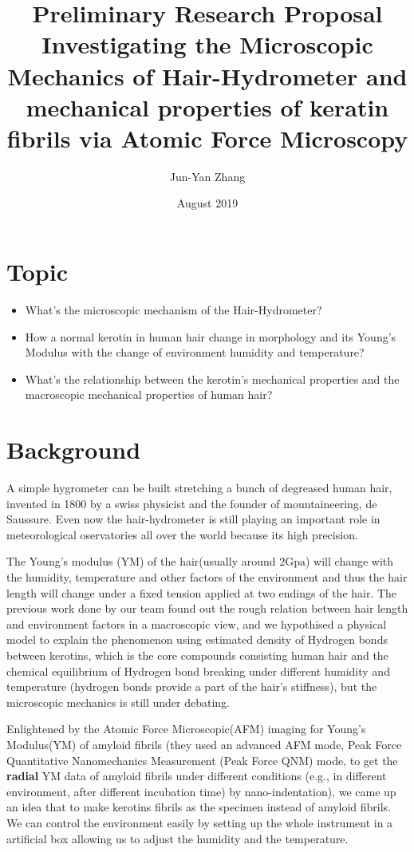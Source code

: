 \documentclass{article}
\title{\textbf{Preliminary Research Proposal}\\Investigating the Microscopic Mechanics of Hair-Hydrometer and mechanical properties of keratin fibrils via Atomic Force Microscopy }
\author{Jun-Yan Zhang}
\date{August 2019}
\begin{document}
\maketitle


\section{Topic}
\begin{itemize}
\item What's the microscopic mechanism of the Hair-Hydrometer?
\item How a normal kerotin in human hair change in morphology and its Young's Modulus with the change of environment humidity and temperature? 
\item What's the relationship between the kerotin's mechanical properties and the macroscopic mechanical properties of human hair?
\end{itemize}

\section{Background}
A simple hygrometer can be built stretching a bunch of degreased human hair, invented in 1800 by a swiss physicist and the founder of mountaineering, de Saussure. Even now the hair-hydrometer is still playing an important role in meteorological oservatories all over the world because its high precision. 

The Young's modulus (YM)  of the hair(usually around $2\mathrm{Gpa}$) will change with the humidity, temperature and other factors of the environment and thus the hair length will change under a fixed tension applied at two endings of the hair. The previous work done by our team found out the rough relation between hair length and environment factors in a macroscopic view, and we hypothised a physical model to explain the phenomenon using estimated density of Hydrogen bonds between kerotins, which is the core compounds consisting human hair and the chemical equilibrium of Hydrogen bond breaking under different humidity and temperature (hydrogen bonds provide a part of the hair's stiffness), but the microscopic mechanics is still under debating.

Enlightened by the Atomic Force Microscopic(AFM) imaging for Young's Modulus(YM) of amyloid fibrils \citep{lee2016advances}(they used an advanced AFM mode, Peak Force Quantitative Nanomechanics Measurement (Peak Force QNM) mode, to get the \textbf{radial} YM data of amyloid fibrils under different conditions (e.g., in different environment, after different incubation time) by nano-indentation), we came up an idea that to make kerotins fibrils as the specimen instead of amyloid fibrils.  \\
We can control the environment easily by setting up the whole instrument in a artificial box allowing us to adjust the humidity and the temperature.
\end{document}
